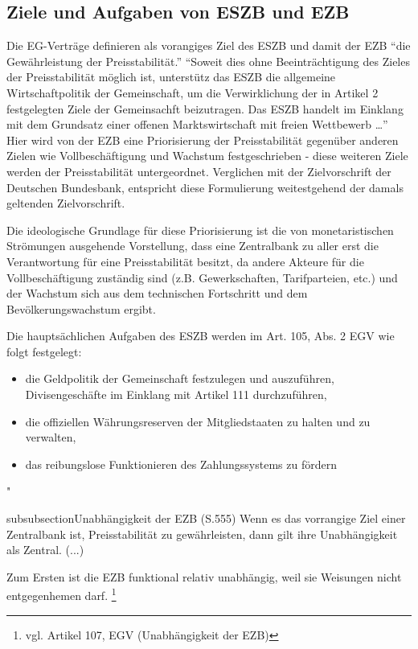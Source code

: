\documentclass[
    onecolumn,
    a4paper,
    abstracton,
    parskip=half
    ,final
    ]{scrartcl}
\begin{document}
\subsection{Ziele und Aufgaben von ESZB und EZB}
Die EG-Vertr{\"a}ge definieren als vorangiges Ziel des ESZB und damit der EZB "`die Gew{\"a}hrleistung der Preisstabilit{\"a}t."'
"`Soweit dies ohne Beeintr{\"a}chtigung des Zieles der Preisstabilit{\"a}t m{\"o}glich ist, unterst{\"u}tz das ESZB die allgemeine Wirtschaftpolitik der Gemeinschaft, um die Verwirklichung der in Artikel 2 festgelegten Ziele der Gemeinsachft beizutragen. Das ESZB handelt im Einklang mit dem Grundsatz einer offenen Marktswirtschaft mit freien Wettbewerb \ldots"'\citep[vgl.][S.554]{Basseler2010}
Hier wird von der EZB eine Priorisierung der Preisstabilit{\"a}t gegen{\"u}ber anderen Zielen wie Vollbesch{\"a}ftigung und Wachstum festgeschrieben - diese weiteren Ziele werden der Preisstabilit{\"a}t untergeordnet. Verglichen mit der Zielvorschrift der Deutschen Bundesbank, entspricht diese Formulierung weitestgehend der damals geltenden Zielvorschrift.\citep[vgl.][S.554]{Basseler2010}

Die ideologische Grundlage f{\"u}r diese Priorisierung ist die von monetaristischen Str{\"o}mungen ausgehende Vorstellung, dass eine Zentralbank zu aller erst die Verantwortung f{\"u}r eine Preisstabilit{\"a}t besitzt, da andere Akteure f{\"u}r die Vollbesch{\"a}ftigung zust{\"a}ndig sind (z.B. Gewerkschaften, Tarifparteien, etc.) und der Wachstum sich aus dem technischen Fortschritt und dem Bev{\"o}lkerungswachstum ergibt.

Die haupts{\"a}chlichen Aufgaben des ESZB werden im Art. 105, Abs. 2 EGV wie folgt festgelegt:
\begin{itemize}
    \item{die Geldpolitik der Gemeinschaft festzulegen und auszuf{\"u}hren, Divisengesch{\"a}fte im Einklang mit Artikel 111 durchzuf{\"u}hren,}
    \item{die offiziellen W{\"a}hrungsreserven der Mitgliedstaaten zu halten und zu verwalten,}
    \item{das reibungslose Funktionieren des Zahlungssystems zu f{\"o}rdern}
\end{itemize} \citep[vgl.][S.555]{Basseler2010} "

subsubsection{Unabh{\"a}ngigkeit der EZB}
(S.555)
Wenn es das vorrangige Ziel einer Zentralbank ist, Preisstabilit{\"a}t zu gew{\"a}hrleisten, dann gilt ihre Unabh{\"a}ngigkeit als Zentral. (...)

Zum Ersten ist die EZB funktional relativ unabh{\"a}ngig, weil sie Weisungen nicht entgegenhemen darf. \footnote[34]{vgl. Artikel 107, EGV (Unabh{\"a}ngigkeit der EZB)}
\end{document}
